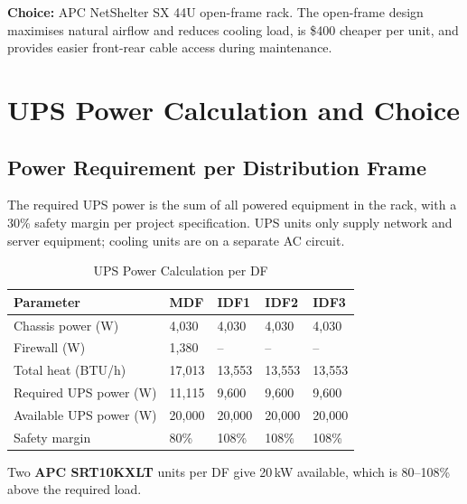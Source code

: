 \documentclass[12pt,a4paper]{report}
\begin{document}
\textbf{Choice:} APC NetShelter SX 44U open-frame rack.
The open-frame design maximises natural airflow and reduces cooling load,
is \$400 cheaper per unit, and provides easier front-rear cable access during maintenance.

\section{UPS Power Calculation and Choice}

\subsection{Power Requirement per Distribution Frame}

The required UPS power is the sum of all powered equipment in the rack,
with a 30\% safety margin per project specification.
UPS units only supply network and server equipment; cooling units are on a
separate AC circuit.

\begin{table}[H]
  \centering
  \caption{UPS Power Calculation per DF}
  \label{tab:ups_calc}
  \begin{tabular}{L{5cm} R{2cm} R{2cm} R{2cm} R{2cm}}
    \toprule
    \textbf{Parameter} & \textbf{MDF} & \textbf{IDF1} & \textbf{IDF2} & \textbf{IDF3} \\
    \midrule
    Chassis power (W)         & 4{,}030 & 4{,}030 & 4{,}030 & 4{,}030 \\
    Firewall (W)              & 1{,}380 & --      & --      & -- \\
    Total heat (BTU/h)        & 17{,}013 & 13{,}553 & 13{,}553 & 13{,}553 \\
    Required UPS power (W)    & 11{,}115 & 9{,}600 & 9{,}600 & 9{,}600 \\
    Available UPS power (W)   & 20{,}000 & 20{,}000 & 20{,}000 & 20{,}000 \\
    Safety margin             & 80\%  & 108\% & 108\% & 108\% \\
    \bottomrule
  \end{tabular}
\end{table}

\noindent Two \textbf{APC SRT10KXLT} units per DF give 20\,kW available, which is 80--108\% above the required load.
\end{document}
